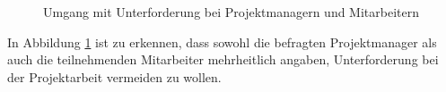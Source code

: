 \begin{figure}[h]
	\centering
	
	
	\caption{Umgang mit Unterforderung bei Projektmanagern und Mitarbeitern}
	\label{fig:ergebnisse:fallstudie:kurven:abb1}
\end{figure}

In Abbildung \ref{fig:ergebnisse:fallstudie:kurven:abb1} ist zu erkennen, dass sowohl die befragten Projektmanager als auch die teilnehmenden Mitarbeiter mehrheitlich angaben, Unterforderung bei der Projektarbeit vermeiden zu wollen.
